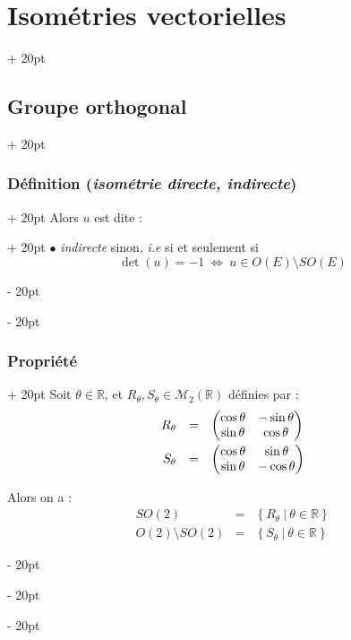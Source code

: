 \documentclass[a4paper, 12pt, twoside]{article}
\newcommand{\R}{\mathbb{R}} %
\newcommand{\set}[1]{\left\{ #1 \right\}}
\newcommand{\ssi}{\ \Leftrightarrow \ }
\newcommand{\ind}[1][20pt]{\advance\leftskip + #1}
\newcommand{\deind}[1][20pt]{\advance\leftskip - #1}
\newenvironment{indt}[2][20pt]{#2 \par \ind[#1]}{\par \deind} %
\begin{document}
\begin{indt}{\section{Isométries vectorielles}}
\begin{indt}{\subsection{Groupe orthogonal}}
\begin{indt}{\subsubsection{Définition (\textit{isométrie directe, indirecte})}}
\begin{indt}{Alors $u$ est dite :}
                    $\bullet$ \emph{indirecte} sinon, \textit{i.e} si et seulement si
                    \[
                        \det(u) = -1 \ssi u \in O(E) \setminus SO(E)
                    \]
                \end{indt}
            \end{indt}

            \vspace{12pt}
            
            \begin{indt}{\subsubsection{Propriété}}
                Soit $\theta \in \R$, et $R_\theta, S_\theta \in \mathcal M_2(\R)$ définies par :
                \[
                    \begin{array}{rcl}
                        R_\theta
                        &=&
                        \begin{pmatrix}
                            \cos \theta & -\sin \theta
                            \\
                            \sin \theta & \cos \theta
                        \end{pmatrix}
                        \vspace{3pt}
                        \\
                        S_\theta
                        &=&
                        \begin{pmatrix}
                            \cos \theta & \sin \theta
                            \\
                            \sin \theta & -\cos \theta
                        \end{pmatrix}
                    \end{array}
                \]

                Alors on a :
                \[
                    \begin{array}{rcl}
                        SO(2)
                        &=& \set{R_\theta\ |\ \theta \in \R}
                        \\
                        O(2) \setminus SO(2)
                        &=& \set{S_\theta\ |\ \theta \in \R}
                    \end{array}
                \]
            \end{indt}

            \vspace{12pt}
            

\end{indt}
\end{indt}
\end{document}
